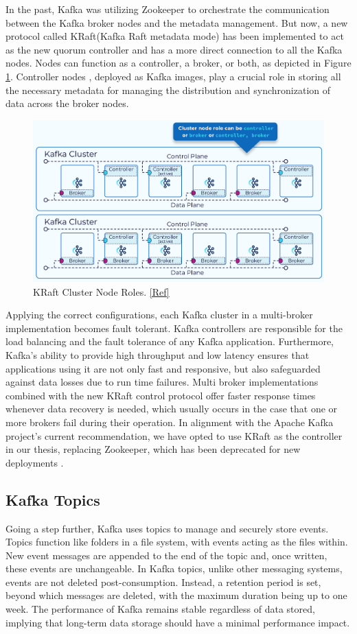 In the past, Kafka was utilizing Zookeeper \cite{zookeeper} to orchestrate the communication between the Kafka broker nodes and the metadata management. But now, a new protocol called KRaft(Kafka Raft metadata mode) \cite{Kraft} has been implemented to act as the new quorum controller and has a more direct connection to all the Kafka nodes. Nodes can function as a controller, a broker, or both, as depicted in Figure \ref{Kafka_Internals_052}. Controller nodes , deployed as Kafka images, play a crucial role in storing all the necessary metadata for managing the distribution and synchronization of data across the broker nodes.

\begin{figure}[htbp]
	\includegraphics[width=0.75\linewidth]{figures/Kafka_Internals_052.png}
	\centering
	\caption{KRaft Cluster Node Roles. \href{https://developer.confluent.io/courses/architecture/control-plane/}{[Ref]}}
	\label{Kafka_Internals_052}
\end{figure}

Applying the correct configurations, each Kafka cluster in a multi-broker implementation becomes fault tolerant. Kafka controllers are responsible for the load balancing and the fault tolerance of any Kafka application. 
Furthermore, Kafka's ability to provide high throughput and low latency ensures that applications using it are not only fast and responsive, but also safeguarded against data losses due to run time failures. Multi broker implementations combined with the new KRaft control protocol offer faster response times whenever data recovery is needed, which usually occurs in the case that one or more brokers fail during their operation. In alignment with the Apache Kafka project's current recommendation, we have opted to use KRaft as the controller in our thesis, replacing Zookeeper, which has been deprecated for new deployments \cite{KraftRecommendation}.

\subsection{Kafka Topics}\label{kafka_topics}
Going a step further, Kafka uses topics to manage and securely store events. Topics function like folders in a file system, with events acting as the files within. New event messages are appended to the end of the topic and, once written, these events are unchangeable. In Kafka topics, unlike other messaging systems, events are not deleted post-consumption. Instead, a retention period is set, beyond which messages are deleted, with the maximum duration being up to one week. The performance of Kafka remains stable regardless of data stored, implying that long-term data storage should have a minimal performance impact.
